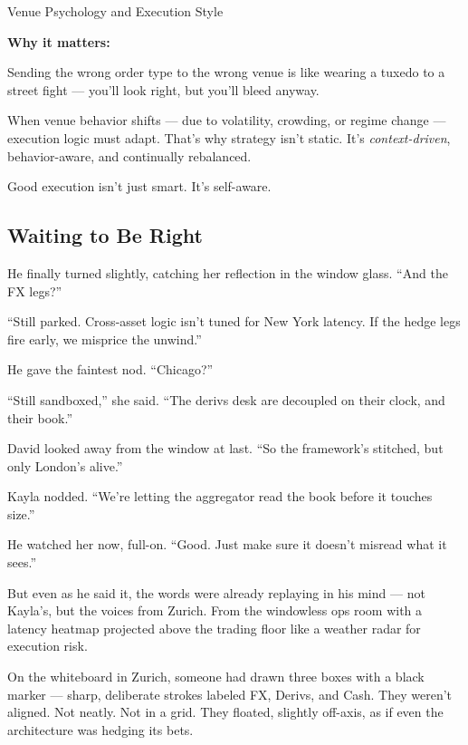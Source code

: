 \begin{TechnicalSidebar}{Venue Psychology and Execution Style}
\begin{itemize}
  \end{itemize}

  \medskip

  \textbf{Why it matters:}

  Sending the wrong order type to the wrong venue is like wearing a tuxedo to a street fight — you'll look right, but you’ll bleed anyway.

  \medskip

  When venue behavior shifts — due to volatility, crowding, or regime change — execution logic must adapt.  
  That’s why strategy isn’t static. It’s \textit{context-driven}, behavior-aware, and continually rebalanced.

  \medskip

  Good execution isn't just smart. It's self-aware.

\end{TechnicalSidebar}








\subsection{Waiting to Be Right}

He finally turned slightly, catching her reflection in the window glass.
“And the FX legs?”

“Still parked. Cross-asset logic isn’t tuned for New York latency. If the hedge legs fire early, we misprice the unwind.”

He gave the faintest nod.
“Chicago?”

“Still sandboxed,” she said. “The derivs desk are decoupled on their clock, and their book.”

David looked away from the window at last.
“So the framework’s stitched, but only London’s alive.”

Kayla nodded.
“We’re letting the aggregator read the book before it touches size.”

He watched her now, full-on.
“Good. Just make sure it doesn’t misread what it sees.”

But even as he said it, the words were already replaying in his mind —
not Kayla’s, but the voices from Zurich.
From the windowless ops room with a latency heatmap projected above the trading floor like a weather 
radar for execution risk.

On the whiteboard in Zurich, someone had drawn three boxes with a black marker — sharp, deliberate strokes labeled FX, Derivs, 
and Cash. They weren’t aligned. Not neatly. Not in a grid.
They floated, slightly off-axis, as if even the architecture was hedging its bets.

